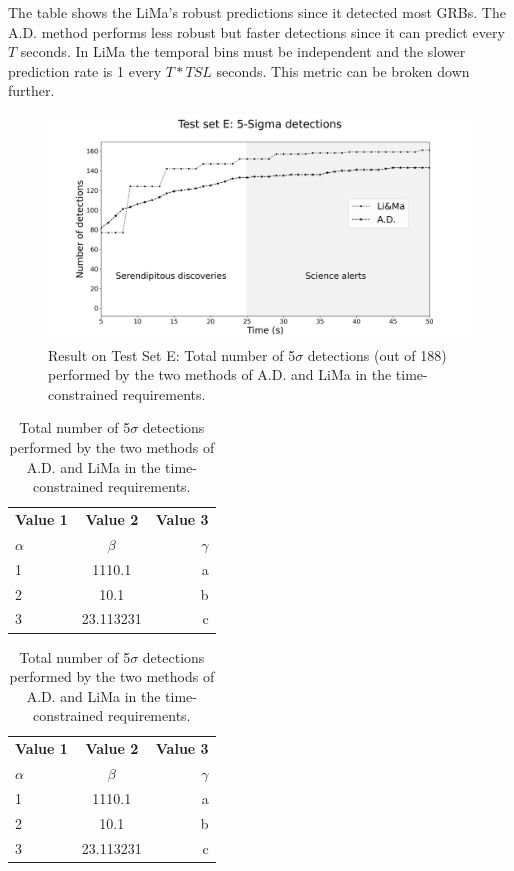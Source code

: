 The table shows the LiMa's robust predictions since it detected most GRBs. The A.D. method performs less robust but faster detections since it can predict every $T$ seconds. In LiMa the temporal bins must be independent and the slower prediction rate is 1  every $T*TSL$ seconds. This metric can be broken down further. 
\begin{figure}[t]
\centering
\includegraphics[width=1\textwidth]{figures/experiments/ad_vs_li_ma_testset_e.png}
\caption{Result on Test Set E: Total number of 5$\sigma$ detections (out of 188) performed by the two methods of A.D. and LiMa in the time-constrained requirements. }
\label{f:ad-vs-lima}
\end{figure}



\begin{table}[!htb]
    \begin{minipage}{.5\linewidth}
      \centering
    \begin{tabular}{l|c|r} %
      \textbf{Value 1} & \textbf{Value 2} & \textbf{Value 3}\\
      $\alpha$ & $\beta$ & $\gamma$ \\
      \hline
      1 & 1110.1 & a\\
      2 & 10.1 & b\\
      3 & 23.113231 & c\\
    \end{tabular}
    \end{minipage}
    \begin{minipage}{.5\linewidth}
      \centering
    \begin{tabular}{l|c|r} %
      \textbf{Value 1} & \textbf{Value 2} & \textbf{Value 3}\\
      $\alpha$ & $\beta$ & $\gamma$ \\
      \hline
      1 & 1110.1 & a\\
      2 & 10.1 & b\\
      3 & 23.113231 & c\\
    \end{tabular}
    \end{minipage}
   \caption{Total number of 5$\sigma$ detections performed by the two methods of A.D. and LiMa in the time-constrained requirements.}    
    \label{tab:Experiment-Results-2} 
\end{table}


